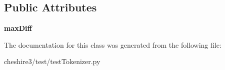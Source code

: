\subsection*{Public Attributes}
\begin{DoxyCompactItemize}
\item 
\hypertarget{classcheshire3_1_1test_1_1test_tokenizer_1_1_regexp_find_punctuation_offset_tokenizer_test_case_a95a21d43ccd17bc150962cbd643ae49b}{{\bfseries max\-Diff}}\label{classcheshire3_1_1test_1_1test_tokenizer_1_1_regexp_find_punctuation_offset_tokenizer_test_case_a95a21d43ccd17bc150962cbd643ae49b}

\end{DoxyCompactItemize}


The documentation for this class was generated from the following file\-:\begin{DoxyCompactItemize}
\item 
cheshire3/test/test\-Tokenizer.\-py\end{DoxyCompactItemize}
